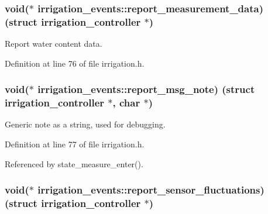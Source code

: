 \hypertarget{structirrigation__events_add396df12f986fff177801aa022c35f2}{}
\subsubsection[{report\+\_\+measurement\+\_\+data}]{\setlength{\rightskip}{0pt plus 5cm}void($\ast$ irrigation\+\_\+events\+::report\+\_\+measurement\+\_\+data) (struct {\bf irrigation\+\_\+controller} $\ast$)}\label{structirrigation__events_add396df12f986fff177801aa022c35f2}


Report water content data. 



Definition at line 76 of file irrigation.\+h.

\hypertarget{structirrigation__events_aeaa45961cfef7d031a086b2176f4c9a8}{}
\subsubsection[{report\+\_\+msg\+\_\+note}]{\setlength{\rightskip}{0pt plus 5cm}void($\ast$ irrigation\+\_\+events\+::report\+\_\+msg\+\_\+note) (struct {\bf irrigation\+\_\+controller} $\ast$, char $\ast$)}\label{structirrigation__events_aeaa45961cfef7d031a086b2176f4c9a8}


Generic note as a string, used for debugging. 



Definition at line 77 of file irrigation.\+h.



Referenced by state\+\_\+measure\+\_\+enter().

\hypertarget{structirrigation__events_a41db6d6a624689abdb7be82425ff0b02}{}
\subsubsection[{report\+\_\+sensor\+\_\+fluctuations}]{\setlength{\rightskip}{0pt plus 5cm}void($\ast$ irrigation\+\_\+events\+::report\+\_\+sensor\+\_\+fluctuations) (struct {\bf irrigation\+\_\+controller} $\ast$)}\label{structirrigation__events_a41db6d6a624689abdb7be82425ff0b02}


